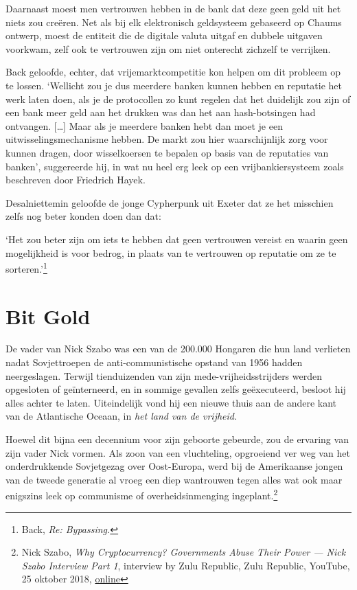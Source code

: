 \documentclass[
  a5paper,
  smalldemyvopaper,11pt,twoside,onecolumn,openright,extrafontsizes,
hidelinks]{memoir}
\renewenvironment{quote}%
               {\list{}{\rightmargin=.3cm\leftmargin=.3cm}%
                \itshape \item[]}%
               {\endlist}
\begin{document}
Daarnaast moest men vertrouwen hebben in de bank dat deze geen geld uit
het niets zou creëren. Net als bij elk elektronisch geldsysteem
gebaseerd op Chaums ontwerp, moest de entiteit die de digitale valuta
uitgaf en dubbele uitgaven voorkwam, zelf ook te vertrouwen zijn om niet
onterecht zichzelf te verrijken.

Back geloofde, echter, dat vrijemarktcompetitie kon helpen om dit
probleem op te lossen. `Wellicht zou je dus meerdere banken kunnen
hebben en reputatie het werk laten doen, als je de protocollen zo kunt
regelen dat het duidelijk zou zijn of een bank meer geld aan het drukken
was dan het aan hash-botsingen had ontvangen. {[}\ldots{]} Maar als je
meerdere banken hebt dan moet je een uitwisselingsmechanisme hebben. De
markt zou hier waarschijnlijk zorg voor kunnen dragen, door
wisselkoersen te bepalen op basis van de reputaties van banken',
suggereerde hij, in wat nu heel erg leek op een vrijbankiersysteem zoals
beschreven door Friedrich Hayek.

Desalniettemin geloofde de jonge Cypherpunk uit Exeter dat ze het
misschien zelfs nog beter konden doen dan dat:

\begin{quote}
`Het zou beter zijn om iets te hebben dat geen vertrouwen vereist en
waarin geen mogelijkheid is voor bedrog, in plaats van te vertrouwen op
reputatie om ze te sorteren.'\footnote{Back, \emph{Re: Bypassing.}}
\end{quote}

\chapter{Bit Gold}\label{bit-gold}

De vader van Nick Szabo was een van de 200.000 Hongaren die hun land
verlieten nadat Sovjettroepen de anti-communistische opstand van 1956
hadden neergeslagen. Terwijl tienduizenden van zijn
mede-vrijheidsstrijders werden opgesloten of geïnterneerd, en in sommige
gevallen zelfs geëxecuteerd, besloot hij alles achter te laten.
Uiteindelijk vond hij een nieuwe thuis aan de andere kant van de
Atlantische Oceaan, in \emph{het land van de vrijheid}.

Hoewel dit bijna een decennium voor zijn geboorte gebeurde, zou de
ervaring van zijn vader Nick vormen. Als zoon van een vluchteling,
opgroeiend ver weg van het onderdrukkende Sovjetgezag over Oost-Europa,
werd bij de Amerikaanse jongen van de tweede generatie al vroeg een diep
wantrouwen tegen alles wat ook maar enigszins leek op communisme of
overheidsinmenging ingeplant.\footnote{Nick Szabo, \emph{Why
  Cryptocurrency? Governments Abuse Their Power --- Nick Szabo Interview
  Part 1}, interview by Zulu Republic, Zulu Republic, YouTube, 25
  oktober 2018,
  \href{https://www.youtube.com/watch?v=LZw4LNLYUgc}{online}}
\end{document}
